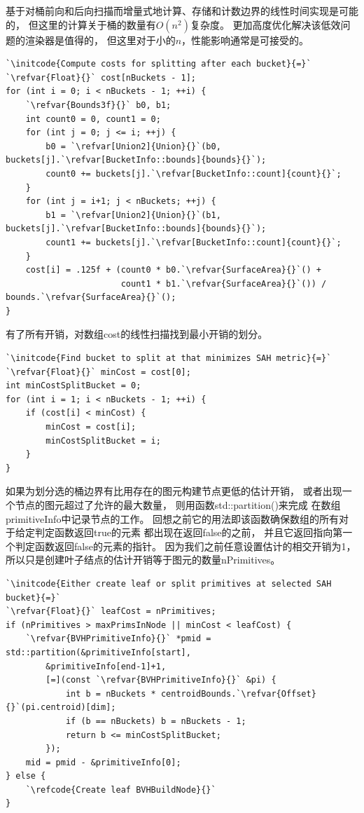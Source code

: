 基于对桶前向和后向扫描而增量式地计算、存储和计数边界的线性时间实现是可能的，
但这里的计算关于桶的数量有$O(n^2)$复杂度。
更加高度优化解决该低效问题的渲染器是值得的，
但这里对于小的$n$，性能影响通常是可接受的。
\begin{lstlisting}
`\initcode{Compute costs for splitting after each bucket}{=}`
`\refvar{Float}{}` cost[nBuckets - 1];
for (int i = 0; i < nBuckets - 1; ++i) {
    `\refvar{Bounds3f}{}` b0, b1;
    int count0 = 0, count1 = 0;
    for (int j = 0; j <= i; ++j) {
        b0 = `\refvar[Union2]{Union}{}`(b0, buckets[j].`\refvar[BucketInfo::bounds]{bounds}{}`);
        count0 += buckets[j].`\refvar[BucketInfo::count]{count}{}`;
    }
    for (int j = i+1; j < nBuckets; ++j) {
        b1 = `\refvar[Union2]{Union}{}`(b1, buckets[j].`\refvar[BucketInfo::bounds]{bounds}{}`);
        count1 += buckets[j].`\refvar[BucketInfo::count]{count}{}`;
    }
    cost[i] = .125f + (count0 * b0.`\refvar{SurfaceArea}{}`() +
                       count1 * b1.`\refvar{SurfaceArea}{}`()) / bounds.`\refvar{SurfaceArea}{}`();
}
\end{lstlisting}

有了所有开销，对数组{\ttfamily cost}的线性扫描找到最小开销的划分。
\begin{lstlisting}
`\initcode{Find bucket to split at that minimizes SAH metric}{=}`
`\refvar{Float}{}` minCost = cost[0];
int minCostSplitBucket = 0;
for (int i = 1; i < nBuckets - 1; ++i) {
    if (cost[i] < minCost) {
        minCost = cost[i];
        minCostSplitBucket = i;
    }
}
\end{lstlisting}

如果为划分选的桶边界有比用存在的图元构建节点更低的估计开销，
或者出现一个节点的图元超过了允许的最大数量，
则用函数{\ttfamily std::partition()}来完成
在数组{\ttfamily primitiveInfo}中记录节点的工作。
回想之前它的用法即该函数确保数组的所有对于给定判定函数返回{\ttfamily true}的元素
都出现在返回{\ttfamily false}的之前，
并且它返回指向第一个判定函数返回{\ttfamily false}的元素的指针。
因为我们之前任意设置估计的相交开销为1，
所以只是创建叶子结点的估计开销等于图元的数量{\ttfamily nPrimitives}。
\begin{lstlisting}
`\initcode{Either create leaf or split primitives at selected SAH bucket}{=}`
`\refvar{Float}{}` leafCost = nPrimitives;
if (nPrimitives > maxPrimsInNode || minCost < leafCost) {
    `\refvar{BVHPrimitiveInfo}{}` *pmid = std::partition(&primitiveInfo[start],
        &primitiveInfo[end-1]+1, 
        [=](const `\refvar{BVHPrimitiveInfo}{}` &pi) {
            int b = nBuckets * centroidBounds.`\refvar{Offset}{}`(pi.centroid)[dim];
            if (b == nBuckets) b = nBuckets - 1;
            return b <= minCostSplitBucket;
        });
    mid = pmid - &primitiveInfo[0];
} else {
    `\refcode{Create leaf BVHBuildNode}{}`
}
\end{lstlisting}

